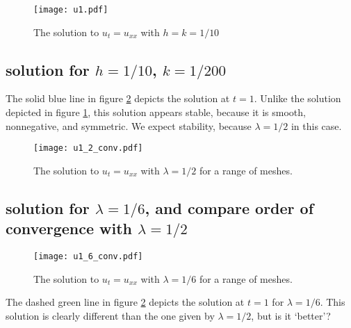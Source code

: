 \documentclass[11pt]{amsart}
\begin{document}
\begin{figure}[t]
\begin{center} 
\texttt{[image: u1.pdf]}
\caption{The solution to $u_t = u_{xx}$ with  $h=k=1/10$ }
\label{u1} 
\end{center}
\end{figure}
  
\subsection{solution for $h=1/10$, $k=1/200$}
The solid blue line in figure \ref{u2} depicts the solution at $t=1$. Unlike the solution depicted in figure \ref{u1}, this solution appears stable, because it is smooth, nonnegative, and symmetric. We expect stability, because $\lambda = 1/2$ in this case. 

\begin{figure}[t]
\begin{center} 
\texttt{[image: u1\_2\_conv.pdf]}
\caption{The solution to $u_t = u_{xx}$ with $\lambda = 1/2$ for a range of meshes.}
\label{u2} 
\end{center}
\end{figure}

\subsection{solution for $\lambda = 1/6$, and compare order of convergence with $\lambda = 1/2$ } 

\begin{figure}[t]
\begin{center} 
\texttt{[image: u1\_6\_conv.pdf]}
\caption{The solution to $u_t = u_{xx}$ with  $\lambda =1/6$ for a range of meshes.  }
\label{u16} 
\end{center}
\end{figure}

The dashed green line in figure \ref{u2} depicts the solution at $t=1$ for $\lambda =1/6$. This solution is clearly different than the one given by $\lambda =1/2$, but is it `better'? 
\end{document}
